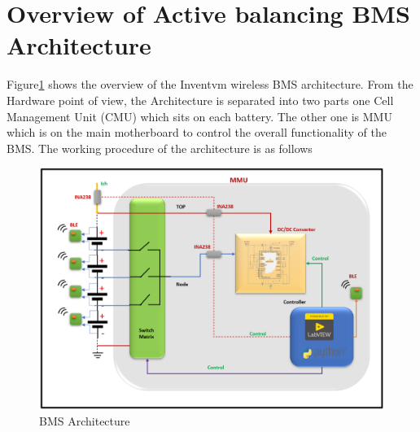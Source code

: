 \section{Overview of Active balancing BMS Architecture}
Figure\ref{fig:BMS Architecture} shows the overview of the Inventvm wireless BMS architecture. From the Hardware point of view, the Architecture is separated into two parts one Cell Management Unit (CMU) which sits on each battery. The other one is MMU which is on the main motherboard to control the overall functionality of the BMS. The working procedure of the architecture is as follows
\begin{figure}[h]
	\centering
	\includegraphics[width=1\textwidth]{Chap04/Figures/BMS_Architecture_border.PNG}
	\caption{BMS Architecture} 
	\label{fig:BMS Architecture}
\end{figure}
